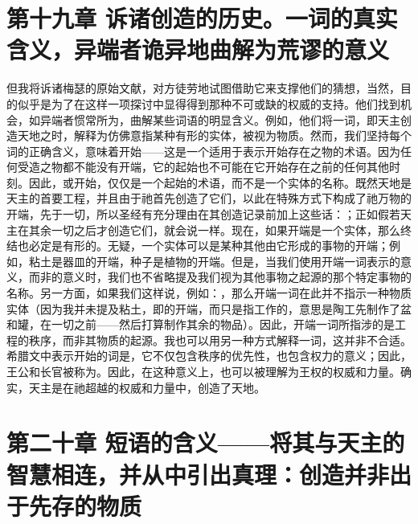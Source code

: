 
\section{第十九章 诉诸创造的历史。一词的真实含义，异端者诡异地曲解为荒谬的意义}

但我将诉诸梅瑟的原始文献，对方徒劳地试图借助它来支撑他们的猜想，当然，目的似乎是为了在这样一项探讨中显得得到那种不可或缺的权威的支持。他们找到机会，如异端者惯常所为，曲解某些词语的明显含义。例如，他们将一词，即天主创造天地之时，解释为仿佛意指某种有形的实体，被视为物质。然而，我们坚持每个词的正确含义，意味着开始——这是一个适用于表示开始存在之物的术语。因为任何受造之物都不能没有开端，它的起始也不可能在它开始存在之前的任何其他时刻。因此，或开始，仅仅是一个起始的术语，而不是一个实体的名称。既然天地是天主的首要工程，并且由于祂首先创造了它们，以此在特殊方式下构成了祂万物的开端，先于一切，所以圣经有充分理由在其创造记录前加上这些话：；正如假若天主在其余一切之后才创造它们，就会说一样。现在，如果开端是一个实体，那么终结也必定是有形的。无疑，一个实体可以是某种其他由它形成的事物的开端；例如，粘土是器皿的开端，种子是植物的开端。但是，当我们使用开端一词表示的意义，而非的意义时，我们也不省略提及我们视为其他事物之起源的那个特定事物的名称。另一方面，如果我们这样说，例如：，那么开端一词在此并不指示一种物质实体（因为我并未提及粘土，即的开端，而只是指工作的，意思是陶工先制作了盆和罐，在一切之前——然后打算制作其余的物品）。因此，开端一词所指涉的是工程的秩序，而非其物质的起源。我也可以用另一种方式解释一词，这并非不合适。希腊文中表示开始的词是，它不仅包含秩序的优先性，也包含权力的意义；因此，王公和长官被称为。因此，在这种意义上，也可以被理解为王权的权威和力量。确实，天主是在祂超越的权威和力量中，创造了天地。\par


\section{第二十章 短语的含义——将其与天主的智慧相连，并从中引出真理：创造并非出于先存的物质}

